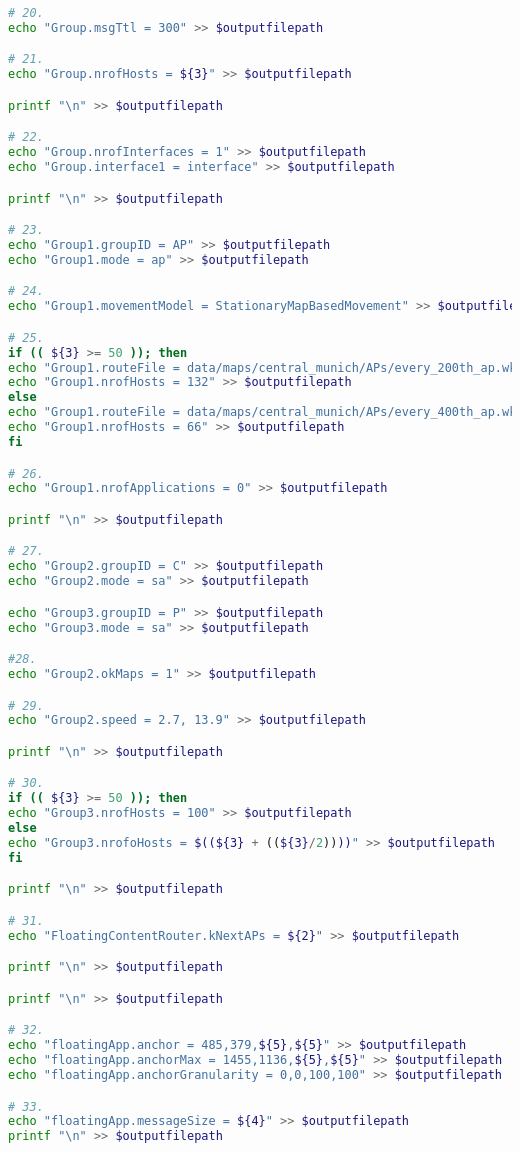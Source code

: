 \begin{lstlisting}[language=bash]
# 20.
echo "Group.msgTtl = 300" >> $outputfilepath

# 21.
echo "Group.nrofHosts = ${3}" >> $outputfilepath

printf "\n" >> $outputfilepath

# 22.
echo "Group.nrofInterfaces = 1" >> $outputfilepath
echo "Group.interface1 = interface" >> $outputfilepath

printf "\n" >> $outputfilepath

# 23.
echo "Group1.groupID = AP" >> $outputfilepath
echo "Group1.mode = ap" >> $outputfilepath

# 24.
echo "Group1.movementModel = StationaryMapBasedMovement" >> $outputfilepath

# 25.
if (( ${3} >= 50 )); then
echo "Group1.routeFile = data/maps/central_munich/APs/every_200th_ap.wkt" >> $outputfilepath
echo "Group1.nrofHosts = 132" >> $outputfilepath
else
echo "Group1.routeFile = data/maps/central_munich/APs/every_400th_ap.wkt" >> $outputfilepath
echo "Group1.nrofHosts = 66" >> $outputfilepath
fi

# 26.
echo "Group1.nrofApplications = 0" >> $outputfilepath

printf "\n" >> $outputfilepath

# 27.
echo "Group2.groupID = C" >> $outputfilepath
echo "Group2.mode = sa" >> $outputfilepath

echo "Group3.groupID = P" >> $outputfilepath
echo "Group3.mode = sa" >> $outputfilepath

#28.
echo "Group2.okMaps = 1" >> $outputfilepath

# 29.
echo "Group2.speed = 2.7, 13.9" >> $outputfilepath

printf "\n" >> $outputfilepath

# 30.
if (( ${3} >= 50 )); then
echo "Group3.nrofHosts = 100" >> $outputfilepath
else
echo "Group3.nrofoHosts = $((${3} + ((${3}/2))))" >> $outputfilepath
fi

printf "\n" >> $outputfilepath

# 31.
echo "FloatingContentRouter.kNextAPs = ${2}" >> $outputfilepath

printf "\n" >> $outputfilepath

printf "\n" >> $outputfilepath

# 32.
echo "floatingApp.anchor = 485,379,${5},${5}" >> $outputfilepath
echo "floatingApp.anchorMax = 1455,1136,${5},${5}" >> $outputfilepath
echo "floatingApp.anchorGranularity = 0,0,100,100" >> $outputfilepath

# 33.
echo "floatingApp.messageSize = ${4}" >> $outputfilepath
printf "\n" >> $outputfilepath


\end{lstlisting}
